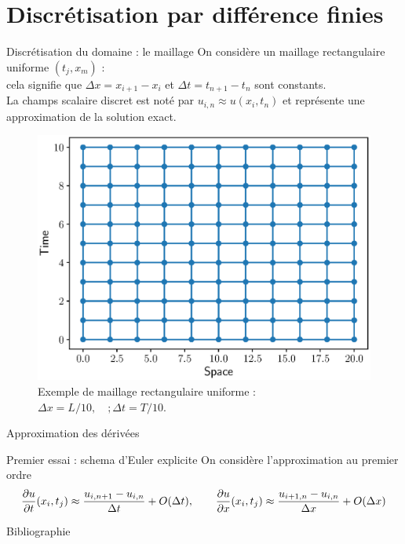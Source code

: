 \documentclass[aspectratio=169, french]{beamer}
\begin{document}
\section{Discrétisation par différence finies}

\begin{frame}{Discrétisation du domaine : le maillage}
On considère un maillage rectangulaire uniforme $(t_j, x_m)$ : \\
cela signifie que $\Delta x = x_{i+1}- x_i $ et $\Delta t = t_{n+1}- t_n$ sont constants. \\
  \vspace{.5cm}
La champs scalaire discret est noté par $u_{i, n} \approx u(x_i, t_n)$ et représente une approximation de la solution exact.


\begin{figure}
\includegraphics[height=.6\textheight]{mesh.eps}
\caption*{Exemple de maillage rectangulaire uniforme : $\Delta x = L/10, \quad; \Delta t=T/10$.}
\end{figure}
	
\end{frame}

\begin{frame}{Approximation des dérivées}
	\begin{block}{Premier essai : schema d'Euler explicite}
		On considère l'approximation au premier ordre
		\begin{equation*}
			\diffp{u}{t}(x_i, t_j) \approx \frac{u_{i, n+1} - u_{i, n}}{\Delta t} + O(\Delta t), \qquad \diffp{u}{x}(x_i, t_j) \approx \frac{u_{i+1, n} - u_{i, n}}{\Delta x} + O(\Delta x) 
		\end{equation*}
	\end{block}
\end{frame}




\begin{frame}{Bibliographie}
	\nocite{*}
	\printbibliography
\end{frame}
	
	
\end{document}
